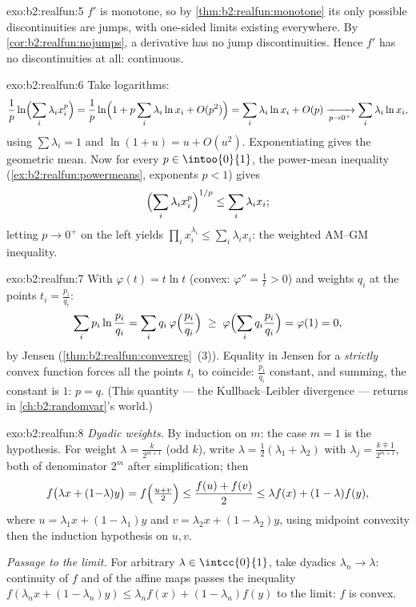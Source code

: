 \begin{solution}{exo:b2:realfun:5}
$f'$ is monotone, so by \cref{thm:b2:realfun:monotone} its only
possible discontinuities are jumps, with one-sided limits existing
everywhere. By \cref{cor:b2:realfun:nojumps}, a derivative has no
jump discontinuities. Hence $f'$ has no discontinuities at all:
continuous.
\end{solution}

\begin{solution}{exo:b2:realfun:6}
Take logarithms:
\[
\frac1p \ln\Bigl(\sum_i \lambda_i x_i^p\Bigr)
= \frac1p \ln\Bigl(1 + p\sum_i \lambda_i \ln x_i +
O(p^2)\Bigr)
= \sum_i \lambda_i \ln x_i + O(p)
\xrightarrow[p \to 0^+]{} \sum_i \lambda_i \ln x_i ,
\]
using $\sum\lambda_i = 1$ and $\ln(1 + u) = u + O(u^2)$.
Exponentiating gives the geometric mean. Now for every $p \in
\intoo{0}{1}$, the power-mean inequality
(\cref{ex:b2:realfun:powermeans}, exponents $p < 1$) gives
\[
\Bigl(\sum_i \lambda_i x_i^p\Bigr)^{1/p} \leq \sum_i\lambda_i x_i ;
\]
letting $p \to 0^+$ on the left yields $\prod_i x_i^{\lambda_i}
\leq \sum_i \lambda_i x_i$: the weighted AM--GM inequality.
\end{solution}

\begin{solution}{exo:b2:realfun:7}
With $\varphi(t) = t\ln t$ (convex: $\varphi'' = \frac1t > 0$) and
weights $q_i$ at the points $t_i = \frac{p_i}{q_i}$:
\[
\sum_i p_i \ln\frac{p_i}{q_i}
= \sum_i q_i\, \varphi\Bigl(\frac{p_i}{q_i}\Bigr)
\;\geq\; \varphi\Bigl(\sum_i q_i \frac{p_i}{q_i}\Bigr)
= \varphi(1) = 0 ,
\]
by Jensen (\cref{thm:b2:realfun:convexreg}~(3)). Equality in
Jensen for a \emph{strictly} convex function forces all the points
$t_i$ to coincide: $\frac{p_i}{q_i}$ constant, and summing, the
constant is $1$: $p = q$. (This quantity --- the Kullback--Leibler
divergence --- returns in \cref{ch:b2:randomvar}'s world.)
\end{solution}

\begin{solution}{exo:b2:realfun:8}
\emph{Dyadic weights.} By induction on $m$: the case $m = 1$ is the
hypothesis. For weight $\lambda = \frac{k}{2^{m+1}}$ (odd $k$),
write $\lambda = \frac12(\lambda_1 + \lambda_2)$ with $\lambda_j =
\frac{k \mp 1}{2^{m+1}}$, both of denominator $2^m$ after
simplification; then
\[
f\bigl(\lambda x + (1{-}\lambda)y\bigr)
= f\Bigl(\tfrac{u + v}{2}\Bigr)
\leq \frac{f(u) + f(v)}{2}
\leq \lambda f(x) + (1 - \lambda) f(y),
\]
where $u = \lambda_1 x + (1 - \lambda_1)y$ and $v = \lambda_2 x +
(1-\lambda_2)y$, using midpoint convexity then the induction
hypothesis on $u, v$.

\emph{Passage to the limit.} For arbitrary $\lambda \in
\intcc{0}{1}$, take dyadics $\lambda_n \to \lambda$: continuity of
$f$ and of the affine maps passes the inequality
$f(\lambda_n x + (1-\lambda_n)y) \leq \lambda_n f(x) +
(1-\lambda_n)f(y)$ to the limit: $f$ is convex.
\end{solution}

